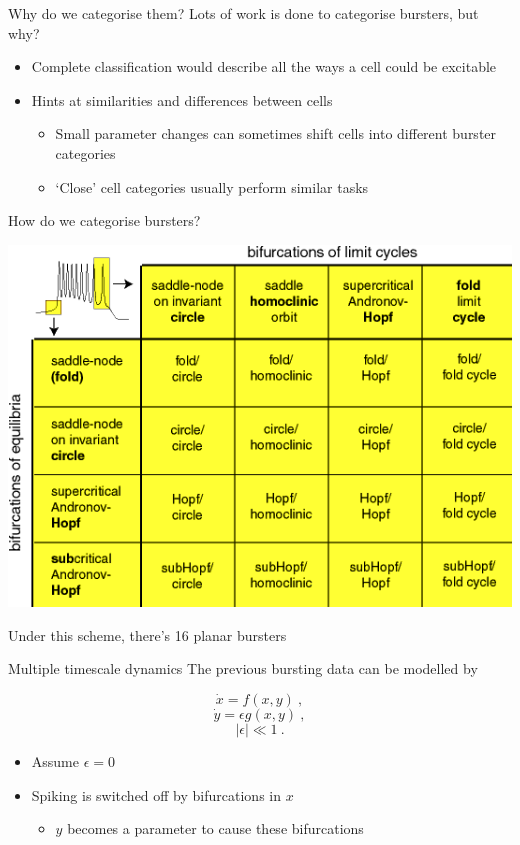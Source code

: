 \documentclass[presentation]{beamer}
\begin{document}
\begin{frame}[label={sec:org515f693}]{Why do we categorise them?}
Lots of work is done to categorise bursters, but why?
\vfill
\begin{itemize}
\item Complete classification would describe all the ways a cell could be excitable
\end{itemize}
\vfill
\begin{itemize}
\item Hints at similarities and differences between cells
\begin{itemize}
\item Small parameter changes can sometimes shift cells into different burster categories
\item `Close' cell categories usually perform similar tasks
\end{itemize}
\end{itemize}
\end{frame}


\begin{frame}[label={sec:org940aad4}]{How do we categorise bursters?}
\begin{center}
\includegraphics[height=.75\textheight]{./categories.png}
\end{center}

Under this scheme, there's 16 planar bursters
\end{frame}


\begin{frame}[label={sec:orge068efd}]{Multiple timescale dynamics}
The previous bursting data can be modelled by

\[\dot{x} = f(x,y)~,\]
\[\dot{y} = \epsilon g(x,y)~,\]
\[|\epsilon| \ll 1~.\]

\begin{itemize}
\item Assume \(\epsilon=0\)
\item Spiking is switched off by bifurcations in \(x\)
\begin{itemize}
\item \(y\) becomes a parameter to cause these bifurcations
\end{itemize}
\end{itemize}
\end{frame}
\end{document}
